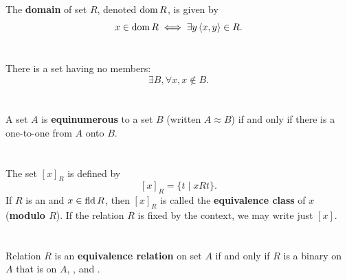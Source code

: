 \documentclass{report}
\begin{document}
  The \textbf{domain} of set $R$, denoted $\mathop{\text{dom}}{R}$, is given by
    $$x \in \mathop{\text{dom}}{R} \iff \exists y \left< x, y \right> \in R.$$



\section{}%

  There is a set having no members: $$\exists B, \forall x, x \not\in B.$$


\section{}%

A set $A$ is \textbf{equinumerous} to a set $B$ (written $A \approx B$) if and
  only if there is a one-to-one  from $A$ onto $B$.


\section{}%

  The set $[x]_R$ is defined by $$[x]_R = \{t \mid xRt\}.$$
  If $R$ is an  and $x \in \mathop{\text{fld}}{R}$, then
    $[x]_R$ is called the \textbf{equivalence class} of $x$
    (\textbf{modulo $R$}).
  If the relation $R$ is fixed by the context, we may write just $[x]$.


\section{}%

  Relation $R$ is an \textbf{equivalence relation} on set $A$ if and only if
    $R$ is a binary  on $A$ that is 
    on $A$, , and .
\end{document}
